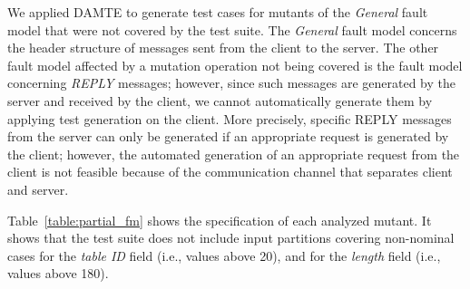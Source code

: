 We applied DAMTE to generate test cases for mutants of the \emph{General} fault model that were not covered by the \PARAM test suite.
The \emph{General} fault model concerns the header structure of \PARAM messages sent from the \PARAM client to the \PARAM server.
The other fault model affected by a mutation operation not being covered is the fault model concerning \emph{REPLY} messages;  however, since such messages are generated by the server and received by the client, we cannot automatically generate them by applying test generation on the client.  More precisely, specific REPLY messages from the server can only be generated if an appropriate request is generated by the client; however, the automated generation of an appropriate request from the client is not feasible because of the communication channel that separates client and server.

Table~\ref{table:partial_fm} shows the specification of each analyzed mutant. It shows that the \PARAM test suite does not include input partitions covering non-nominal cases for the \emph{table ID} field (i.e., values above 20), and for the \emph{length} field (i.e., values above 180).

